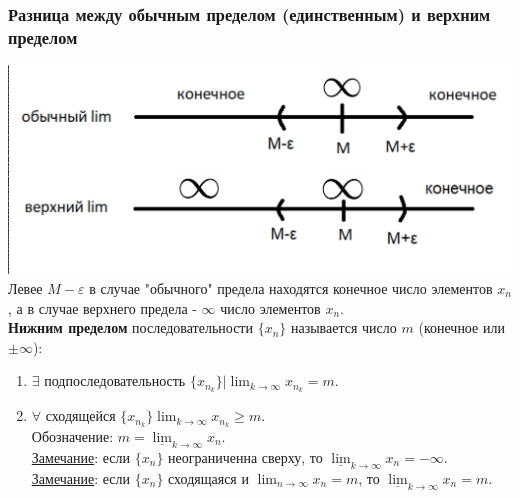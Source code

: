 \documentclass[12pt]{article}
\let\ORIincludegraphics\includegraphics
\renewcommand{\includegraphics}[2][]{\ORIincludegraphics[scale=0.65,#1]{#2}}
\begin{document}
    \subsubsection*{Разница между обычным пределом (единственным) и верхним пределом}
    \includegraphics[width=\linewidth,keepaspectratio]{2.9.1}\\
    Левее $M-\varepsilon$ в случае "обычного" предела находятся конечное число элементов $x_n$, а в случае верхнего предела - $\infty$ число элементов $x_n$.\\
    \textbf{Нижним пределом} последовательности $\{x_n\}$ называется число $m$ (конечное или $\pm \infty$):
    \begin{enumerate}
        \item $\exists$ подпоследовательность $\{x_{n_{k}}\} \Big| \lim_{k\to\infty}x_{n_{k}} = m$.
        \item $\forall$ сходящейся $\{x_{n_{k}}\} \lim_{k\to\infty} x_{n_{k}} \ge m$.\\
        Обозначение: $m = \underline{\lim}_{k\to\infty}x_n$.\\
        \underline{Замечание}: если $\{x_n\}$ неограниченна сверху, то $\underline{\lim}_{k\to\infty}x_n = -\infty$.\\
        \underline{Замечание}: если $\{x_n\}$ сходящаяся и $\lim_{n\to\infty} x_n = m$, то $\underline{\lim}_{k\to\infty}x_n = m$.
    \end{enumerate}
\end{document}
